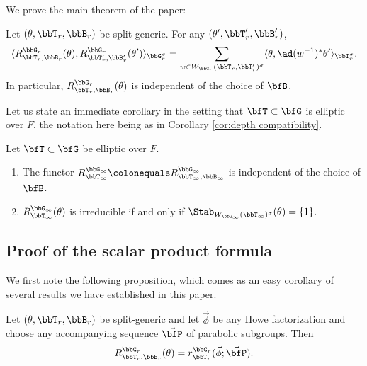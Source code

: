 We prove the main theorem of the paper:

\begin{theorem}\label{thm:scalar product formula}
  Let $(\theta,\bbT_r,\bbB_r)$ be split-generic. For any $(\theta',\bbT_r',\bbB_r')$,
  \begin{equation*}
    \langle R_{\bbT_r,\bbB_r}^{\bbG_r}(\theta), R_{\bbT_r',\bbB_r'}^{\bbG_r}(\theta') \rangle_{\bbG_r^\sigma} = \sum_{w \in W_{\bbG_r}(\bbT_r,\bbT_r')^\sigma} \langle \theta, \ad(w^{-1})^* \theta' \rangle_{\bbT_r^\sigma}.
  \end{equation*}
  In particular, $R_{\bbT_r,\bbB_r}^{\bbG_r}(\theta)$ is independent of the choice of $\bfB$.
\end{theorem}

Let us state an immediate corollary in the setting that $\bfT \subset \bfG$ is elliptic over $F$, the notation here being as in Corollary \ref{cor:depth compatibility}.

\begin{corollary}
  Let $\bfT \subset \bfG$ be elliptic over $F$. 
  \begin{enumerate}
    \item The functor $R_{\bbT_\infty}^{\bbG_\infty} \colonequals R_{\bbT_\infty,\bbB_\infty}^{\bbG_\infty}$ is independent of the choice of $\bfB$.
    \item $R_{\bbT_\infty}^{\bbG_\infty}(\theta)$ is irreducible if and only if $\Stab_{W_{\bbG_\infty}(\bbT_\infty)^\sigma}(\theta) = \{1\}.$
  \end{enumerate}
\end{corollary}


\subsection{Proof of the scalar product formula}

We first note the following proposition, which comes as an easy corollary of several results we have established in this paper.

\begin{proposition}\label{prop:Howe}
  Let $(\theta,\bbT_r,\bbB_r)$ be split-generic and let $\vec \phi$ be any Howe factorization and choose any accompanying sequence $\vec \bfP$ of parabolic subgroups. Then
  \begin{equation*}
    R_{\bbT_r,\bbB_r}^{\bbG_r}(\theta) = r_{\bbT_r}^{\bbG_r}(\vec \phi; \vec \bfP).
  \end{equation*}
\end{proposition}

